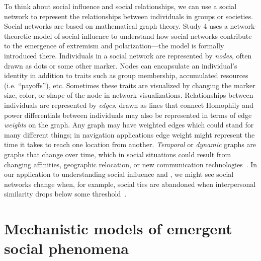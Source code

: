 \documentclass[12pt,letterpaper]{article}
\begin{document}
To think about social influence and social relationships, we can use a social 
network to represent the relationships between individuals
in groups or societies. 
Social networks are based on mathematical graph theory. Study 4 uses a network-theoretic
model of social influence to understand how social networks contribute to
the emergence of extremism and polarization---the model is formally 
introduced there. Individuals in a social network are represented by \emph{nodes},
often drawn as dots or some other marker. Nodes can encapsulate an individual's
identity in addition to traits such as group
membership, accumulated resources (i.e. ``payoffs''), etc. Sometimes these traits are visualized
by changing the marker size, color, or shape of the node in network visualizations.  Relationships
between individuals are represented by \emph{edges}, drawn as lines that connect
Homophily and power differentials between individuals 
may also be represented in terms of edge \emph{weights} on the graph. Any graph
may have weighted edges which could stand for many different things; in
navigation applications edge weight might represent the time it takes to reach 
one location from another. \emph{Temporal} or \emph{dynamic} graphs are graphs that change 
over time, which in social situations could result from changing affinities,
geographic relocation, or new communication technologies~\cite{Li2017}. 
In our application to understanding social influence and , we might see
social networks change when, for example, social ties are abandoned when interpersonal
similarity drops below some threshold~\cite{Axelrod1997,Hegselmann2002,Centola2007,Kossinets2009}.


\section{Mechanistic models of emergent social phenomena}
\end{document}
